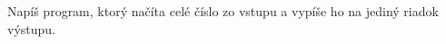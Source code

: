 




Napíš program, ktorý načíta celé číslo zo vstupu a vypíše ho na jediný riadok výstupu.

\koniec


